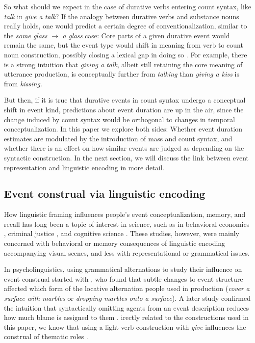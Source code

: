 \documentclass[preprint,12pt,authoryear]{elsarticle}
\begin{document}
So what should we expect in the case of durative verbs entering count syntax, like \emph{talk} in \emph{give a talk}? If the analogy between durative verbs and substance nouns really holds, one would predict a certain degree of conventionalization, similar to the \emph{some glass} $\rightarrow$ \emph{a glass} case: Core parts of a given durative event would remain the same, but the event type would shift in meaning from verb to count noun construction, possibly closing a lexical gap in doing so \citep{Allerton2002,miyagawa1989light,Grimshaw1988,glatz2006funktionsverbgefuge}. For example, there is a strong intuition that \emph{giving a talk}, albeit still retaining the core meaning of utterance production, is conceptually further from \emph{talking} than \emph{giving a kiss} is from \emph{kissing}.

But then, if it is true that durative events in count syntax undergo a conceptual shift in event kind, predictions about event duration are up in the air, since the change induced by count syntax would be orthogonal to changes in temporal conceptualization. In this paper we explore both sides: Whether event duration estimates are modulated by the introduction of mass and count syntax, and whether there is an effect on how similar events are judged as depending on the syntactic construction. In the next section, we will discuss the link between event representation and linguistic encoding in more detail.

\subsection{Event construal via linguistic encoding}
How linguistic framing influences people's event conceptualization, memory, and recall has long been a topic of interest in science, such as in behavioral economics  \citep{kahneman1977intuitive, roy2005underestimating,kruger2004if,halkjelsvik2011read}, criminal justice \citep{loftus1987time,tse2004attention,macar1994controlled,boltz1995effects}, and cognitive science \citep{madden2003does,magliano2000verb}. These studies, however, were mainly concerned with behavioral or memory consequences of linguistic encoding accompanying visual scenes, and less with representational or grammatical issues.

In psycholinguistics, using grammatical alternations to study their influence on event construal started with \citet{gropen1991}, who found that subtle changes to event structure affected which form of the locative alternation people used in production (\emph{cover a surface with marbles} or \emph{dropping marbles onto a surface}). A later study confirmed the intuition that  syntactically omitting agents from an event description reduces how much blame is assigned to them \citep{fausey2010}. irectly related to the constructions used in this paper, we know that using a light verb construction with \emph{give} influences the construal of thematic roles \citep{wittenberg2014sorting,Wittenbergunderreview}. 
\end{document}
